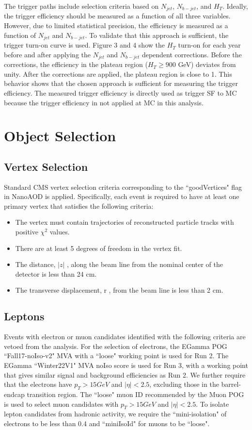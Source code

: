 \documentclass[twoside]{article}
\begin{document}
The trigger paths include selection criteria based on $N_{jet}$, $N_{b-jet}$, and $H_{T}$. Ideally, the trigger efficiency should be measured as a function of all three variables. However, due to limited statistical precision, the efficiency is measured as a function of $N_{jet}$ and $N_{b-jet}$. To validate that this approach is sufficient, the trigger turn-on curve is used. Figure 3 and 4 show the $H_T$ turn-on for each year before and after applying the $N_{jet}$ and $N_{b-jet}$ dependent corrections. Before the corrections, the efficiency in the plateau region ($H_T \geq 900$ GeV) deviates from unity. After the corrections are applied, the plateau region is close to 1. This behavior shows that the chosen approach is sufficient for measuring the trigger efficiency. The measured trigger efficiency is directly used as trigger SF to MC because the trigger efficiency in not applied at MC in this analysis.

\clearpage
\section{Object Selection}
\label{sec:obj}
\subsection{Vertex Selection}
Standard CMS vertex selection criteria corresponding to the ``goodVertices" flag in NanoAOD is applied. Specifically, each event is required to have at least one primary vertex that satisfies the following criteria:
\begin{itemize}
  \item The vertex must contain trajectories of reconstructed particle tracks with positive $\chi^{2}$ values.
  \item There are at least 5 degrees of freedom in the vertex fit.
  \item The distance, $\left| z \right|$ , along the beam line from the nominal center of the detector is less than 24 cm.
  \item The transverse displacement, r , from the beam line is less than 2 cm.

\end{itemize}

\subsection{Leptons}
\label{sec:leptons}
Events with electron or muon candidates identified with the following criteria are vetoed from the analysis. For the selection of electrons, the EGamma POG ``Fall17-noIso-v2" MVA with a ``loose" working point is used for Run 2. The EGamma ``Winter22V1" MVA noIso score is used for Run 3, with a working point that gives similar signal and background efficiencies as Run 2. We further require that the electrons have $p_T > 15 GeV$ and $\left| \eta \right| < 2.5$, excluding those in the barrel-endcap transition region. The ``loose" muon ID recommended by the Muon POG is used to select muon candidates with $p_T > 15 GeV$ and $\left| \eta \right| < 2.5$. To isolate lepton candidates from hadronic activity, we require the ``mini-isolation" of electrons to be less than 0.4 and ``miniIsoId" for muons to be ``loose".
\end{document}
